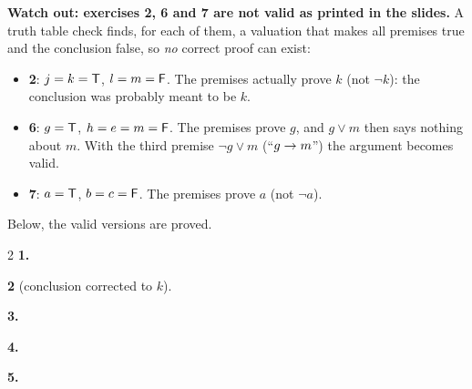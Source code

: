 \begin{nbsolution}
\textbf{Watch out: exercises 2, 6 and 7 are not valid as printed in the slides.} A truth
table check finds, for each of them, a valuation that makes all premises true and the
conclusion false, so \emph{no} correct proof can exist:
\begin{itemize}[nosep]
  \item \textbf{2}: $j = k = \mathsf{T}$, $l = m = \mathsf{F}$. The premises actually prove $k$ (not
        $\neg k$): the conclusion was probably meant to be $k$.
  \item \textbf{6}: $g = \mathsf{T}$, $h = e = m = \mathsf{F}$. The premises prove $g$, and $g \lor m$
        then says nothing about $m$. With the third premise $\neg g \lor m$ (``$g \rightarrow m$'')
        the argument becomes valid.
  \item \textbf{7}: $a = \mathsf{T}$, $b = c = \mathsf{F}$. The premises prove $a$ (not $\neg a$).
\end{itemize}
Below, the valid versions are proved.
\begin{multicols}{2}
\textbf{1.}
\begin{fitchproof}
 \RPrem
{} \RPrem
{} 
 
 
\end{fitchproof}
\textbf{2} (conclusion corrected to $k$).
\begin{fitchproof}
 \RPrem
{} \RPrem
{} \RPrem
{} 
 
 
 
 
\end{fitchproof}
\textbf{3.}
\begin{fitchproof}
 \RPrem
{} \RPrem
{} \RPrem
\open
{} \RAss
{} 
 
 
\close
{} 
\end{fitchproof}
\columnbreak
\textbf{4.}
\begin{fitchproof}
 \RPrem
{} \RPrem
\open
{} \RAss
{} 
 
 
 
 
\close
{} 
\end{fitchproof}
\textbf{5.}
\begin{fitchproof}

\end{fitchproof}
\end{multicols}
\end{nbsolution}
